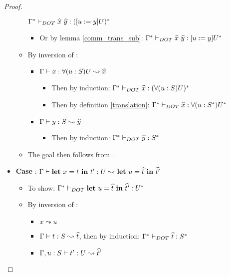 \begin{proof}
\begin{itemize}
\begin{itemize}
                $\TJT{\TRANS{\Gamma}}{\HAT{x}\ \HAT{y}}{\TRANS{(\SUB{u}{y}U)}}$
            \begin{itemize}
                \item Or by lemma \ref{comm_trans_sub}: $\TJT{\TRANS{\Gamma}}
                    {\HAT{x}\ \HAT{y}}{\SUB{u}{y}\TRANS{U}}$
            \end{itemize}
            \item By inversion of :
            \begin{itemize}
                \item $\Gamma \vdash x: \forall(u:S)U \leadsto \widehat{x}$
                \begin{itemize}
                    \item Then by induction: $\Gamma^{*} \vdash_{DOT} \widehat{x}: (\forall(u:S)U)^{*}$
                    \item Then by definition \ref{translation}:
                        $\Gamma^{*} \vdash_{DOT} \widehat{x}: \forall(u:S^{*})U^{*}$
                \end{itemize}
                \item $\Gamma \vdash y: S \leadsto \widehat{y}$
                \begin{itemize}
                    \item Then by induction:
                        $\Gamma^{*} \vdash_{DOT} \widehat{y}: S^{*}$
                \end{itemize}
            \end{itemize}
            \item The goal then follows from .
        \end{itemize}
        \item \textbf{Case} :
            $\Gamma \vdash \textbf{let}\ x = t\ \textbf{in}\ t': U \leadsto \textbf{let}\ u = \widehat{t}\ \textbf{in}\ \widehat{t'}$
        \begin{itemize}
            \item To show:
                $\Gamma^{*} \vdash_{DOT} \textbf{let}\ u = \widehat{t}\ \textbf{in}\ \widehat{t'}: U^{*}$
            \item By inversion of :
            \begin{itemize}
                \item $x \leadsto u$
                \item $\Gamma \vdash t: S \leadsto \widehat{t}$, then by induction:
                    $\Gamma^{*} \vdash_{DOT} \widehat{t}: S^{*}$
                \item $\Gamma, u: S \vdash t': U \leadsto \widehat{t'}$

\end{itemize}
\end{itemize}
\end{itemize}
\end{proof}
